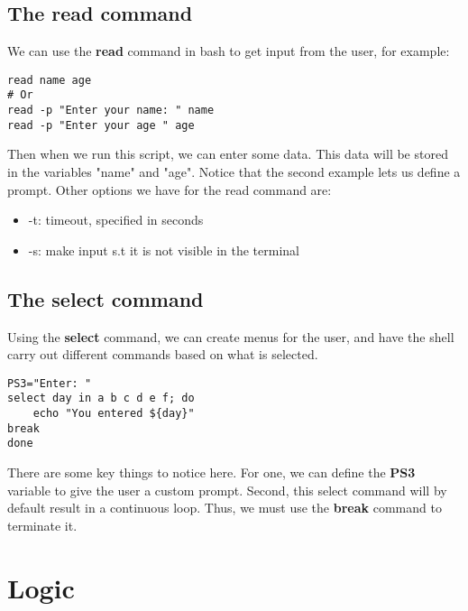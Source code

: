\documentclass{report}
\begin{document}
  \pagebreak \bigbreak \noindent 
  \subsection{The read command}
  \bigbreak \noindent 
  We can use the \textbf{read} command in bash to get input from the user, for example:
  \begin{mdframed}[style=purplebox]
  \begin{verbatim}
read name age
# Or
read -p "Enter your name: " name
read -p "Enter your age " age
  \end{verbatim}
  \bigbreak \noindent
  \end{mdframed}
  \bigbreak \noindent 
  Then when we run this script, we can enter some data. This data will be stored in the variables "name" and "age". Notice that the second example lets us define a prompt.
  \bigbreak \noindent 
  Other options we have for the read command are:
    \begin{itemize}
        \item -t: timeout, specified in seconds
        \item -s: make input s.t it is not visible in the terminal 
    \end{itemize}

    \bigbreak \noindent 
    \subsection{The select command}
    \bigbreak \noindent 
    Using the \textbf{select} command, we can create menus for the user, and have the shell carry out different commands based on what is selected. 
    \begin{mdframed}[style=purplebox]
    \begin{verbatim}
PS3="Enter: "
select day in a b c d e f; do
    echo "You entered ${day}"
break
done
    \end{verbatim}
    \bigbreak \noindent
    \end{mdframed}
    \bigbreak \noindent 
    There are some key things to notice here. For one, we can define the \textbf{PS3} variable to give the user a custom prompt. Second, this select command will by default result in a continuous loop. Thus, we must use the \textbf{break} command to terminate it.

    \pagebreak \bigbreak \noindent 
    \section{\LARGE Logic}
    \bigbreak \noindent 
\end{document}
